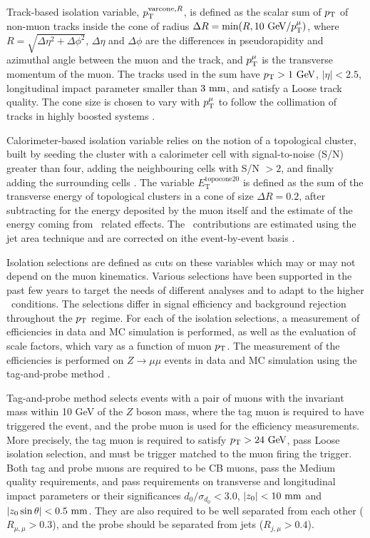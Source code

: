 Track-based isolation variable, $p_{\text{T}}^{\text{varcone}, R}$, is defined
as the scalar sum of $p_{\text{T}}$ of non-muon tracks inside the cone of radius
$\Delta R = \min(R, 10~\text{Ge\kern -0.1em V}/p_{\text{T}}^\mu)$, where $R = \sqrt{\Delta \eta^2 +
\Delta \phi^2}$, $\Delta \eta$ and $\Delta \phi$ are the differences
in pseudorapidity and azimuthal angle between the muon and the track, 
and $p_{\text{T}}^\mu$ is the transverse momentum of the muon.
The tracks used in the sum have $p_{\text{T}} > 1~\text{Ge\kern -0.1em V}$,
$|\eta| < 2.5$, longitudinal impact parameter smaller than $3~\text{mm}$, and satisfy a
Loose track quality. The cone size is chosen to vary with $p_{\text{T}}^\mu$
to follow the collimation of tracks in highly boosted systems \cite{Aad:2016jkr}.

Calorimeter-based isolation variable relies on the notion of a topological
cluster, built by seeding the cluster with a calorimeter cell with
signal-to-noise (S/N) greater than four, adding the neighbouring cells with
S/N $ > 2$, and finally adding the surrounding cells \cite{Aad:2011he}. The
variable $E_\text{T}^\text{topocone20}$ is defined as the sum of
the transverse energy of topological clusters in a cone of size $\Delta
R = 0.2$, after subtracting for the energy deposited by the muon itself
and the estimate of the energy coming from \pileup~related effects. The
\pileup~contributions are estimated using the jet area technique \cite{CACCIARI2008119}
and are corrected on ithe event-by-event basis \cite{Aad:2016jkr}.

Isolation selections are defined as cuts on these variables which
may or may not depend on the muon kinematics. Various
selections have been supported in the past few years to target the needs
of different analyses and to adapt to the higher \pileup~conditions. The 
selections differ in signal efficiency and background rejection
throughout the $p_{\text{T}}$ regime. For each of the isolation selections, a
measurement of efficiencies in data and MC simulation is performed, as
well as the evaluation of scale factors, which vary as a function
of muon $p_{\text{T}}$. The measurement of the efficiencies is performed on
$Z\rightarrow\mu\mu$ events in data and MC simulation using the
tag-and-probe method \cite{Aad:2016jkr}.

Tag-and-probe method selects events with a pair of muons with the invariant mass
within 10 GeV of the $Z$ boson mass, where the tag muon is required to
have triggered the event, and the probe muon is used for the efficiency
measurements. More precisely, the tag muon is required to satisfy
$p_{\text{T}} > 24~\text{Ge\kern -0.1em V}$, pass Loose isolation selection, and must be trigger
matched to the muon firing the trigger. Both tag and probe muons are
required to be CB muons, pass the Medium quality requirements,
and pass requirements on transverse and longitudinal impact parameters
or their significances $d_0/\sigma_{d_0} < 3.0$, $|z_0| < 10~\text{mm}$ and
$|z_0 \sin{\theta}| < 0.5~\text{mm}$. They are also required to be well
separated from each other ($R_{\mu,\mu} > 0.3$), and the probe should
be separated from jets ($R_{j,\mu} > 0.4$).

